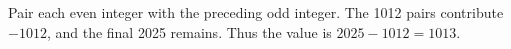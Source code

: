 Pair each even integer with the preceding odd integer. The 1012 pairs contribute $-1012$, and the final 2025 remains. Thus the value is $2025-1012=\boxed{1013}$.
